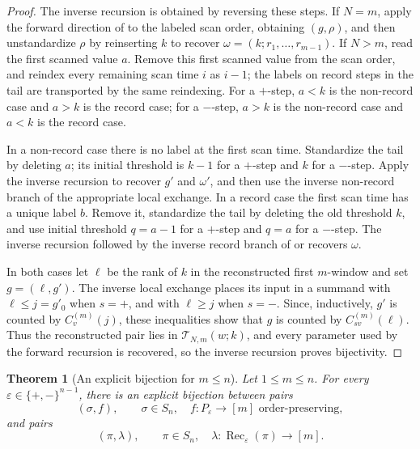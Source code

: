 \documentclass[10pt,a4paper]{amsart}
\newtheorem{theorem}{Theorem}[section]
\newcommand{\eps}{\varepsilon}
\begin{document}
\begin{proof}
The inverse recursion is obtained by reversing these steps.  If \(N=m\), apply
the forward direction of  to the labeled
scan order, obtaining \((g,\rho)\), and then unstandardize \(\rho\) by
reinserting \(k\) to recover $\omega=(k;r_1,\ldots,r_{m-1})$.
If \(N>m\), read the first scanned value \(a\).  Remove this first scanned
value from the scan order, and reindex every remaining scan time \(i\) as
\(i-1\); the labels on record steps in the tail are transported by the same
reindexing.  For a \(+\)-step, \(a<k\) is the non-record case and \(a>k\) is
the record case; for a \(-\)-step, \(a>k\) is the non-record case and \(a<k\)
is the record case.

In a non-record case there is no label at the first scan time.  Standardize the
tail by deleting \(a\); its initial threshold is \(k-1\) for a \(+\)-step and
\(k\) for a \(-\)-step.  Apply the inverse recursion to recover \(g'\) and
\(\omega'\), and then use the inverse non-record branch of the appropriate
local exchange.  In a record case the first scan time has a unique label
\(b\).  Remove it, standardize the tail by deleting the old threshold \(k\),
and use initial threshold \(q=a-1\) for a \(+\)-step and \(q=a\) for a
\(-\)-step.  The inverse recursion followed by the inverse record branch of
 or  recovers
\(\omega\).

In both cases let \(\ell\) be the rank of \(k\) in the reconstructed first
\(m\)-window and set \(g=(\ell,g')\).  The inverse local exchange places its
input in a summand with \(\ell\le j=g'_0\) when \(s=+\), and with
\(\ell\ge j\) when \(s=-\).  Since, inductively, \(g'\) is counted by
\(C_v^{(m)}(j)\), these inequalities show that \(g\) is counted by
\(C_{sv}^{(m)}(\ell)\).  Thus the reconstructed pair lies in
\(\mathcal T_{N,m}(w;k)\), and every parameter used by the forward recursion
is recovered, so the inverse recursion proves bijectivity.
\end{proof}

\begin{theorem}[An explicit bijection for \(m\le n\)]
\label{thm:direct-bijection-m-le-n}
Let \(1\le m\le n\).  For every
\(\eps\in\{+,-\}^{n-1}\), there is an explicit bijection between pairs
\[
(\sigma,f),\qquad
\sigma\in S_n,\quad f:P_\eps\to[m]\text{ order-preserving},
\]
and pairs
\[
(\pi,\lambda),\qquad
\pi\in S_n,\quad
\lambda:\operatorname{Rec}_\eps(\pi)\to[m].
\]
\end{theorem}
\end{document}
